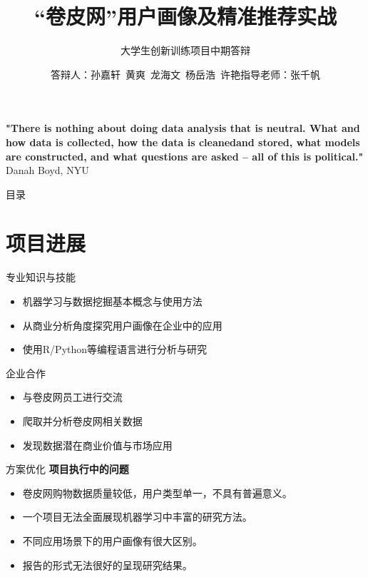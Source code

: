 \documentclass[10pt]{beamer}
\title[中期答辩]{“卷皮网”用户画像及精准推荐实战}
\subtitle{大学生创新训练项目中期答辩}
\author[用户画像与机器学习实战]{答辩人：孙嘉轩\ 黄爽\ 龙海文\ 杨岳浩\ 许艳\newline \newline 指导老师：张千帆}
\institute[]{华中科技大学管理学院}
\begin{document}

\frame{\titlepage}
\begin{frame}
\textbf{"There is nothing about doing data analysis that is neutral.\newline
What and how data is collected, how the data is cleaned\newline and
stored, what models are constructed, and what questions are
asked – all of this is political."}
\newline Danah Boyd, NYU

\end{frame}

\begin{frame}{目录}
\tableofcontents
\end{frame}

\section{项目进展}

\begin{frame}{专业知识与技能}
\begin{itemize}
\item 机器学习与数据挖掘基本概念与使用方法\newline
\item 从商业分析角度探究用户画像在企业中的应用\newline
\item 使用R/Python等编程语言进行分析与研究\newline
\end{itemize}
\end{frame}

\begin{frame}{企业合作}
  \begin{itemize}
  \item 与卷皮网员工进行交流
  \newline
  \item 爬取并分析卷皮网相关数据
  \newline
  \item 发现数据潜在商业价值与市场应用
  \end{itemize}
\end{frame}

\begin{frame}{方案优化}
  \textbf{项目执行中的问题}\newline
   \begin{itemize}
      \item 卷皮网购物数据质量较低，用户类型单一，不具有普遍意义。\newline
      \item 一个项目无法全面展现机器学习中丰富的研究方法。\newline
      \item 不同应用场景下的用户画像有很大区别。\newline
      \item 报告的形式无法很好的呈现研究结果。
   \end{itemize}
\end{frame}
\end{document}

